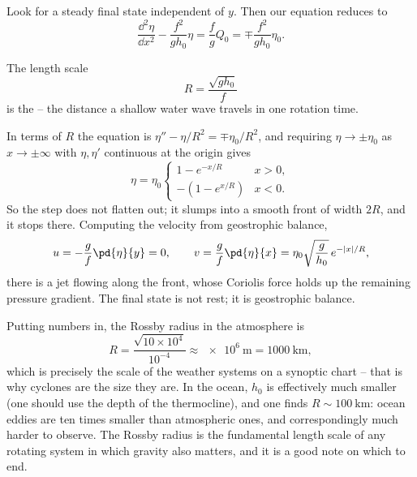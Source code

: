 \begin{example}
	Look for a steady final state independent of $y$. Then our equation reduces to
	$$
	\frac{\dd^2\eta}{\dd x^2} - \frac{f^2}{gh_0}\eta = \frac{f}{g}Q_0 = \mp\frac{f^2}{gh_0}\eta_0.
	$$

	\begin{definition}
		The length scale
		$$
		R = \frac{\sqrt{gh_0}}{f}
		$$
		is the  -- the distance a shallow water wave travels in one rotation time.
	\end{definition}

	In terms of $R$ the equation is $\eta'' - \eta/R^2 = \mp\eta_0/R^2$, and requiring $\eta \to \pm\eta_0$ as $x \to \pm\infty$ with $\eta, \eta'$ continuous at the origin gives
	$$
	\eta = \eta_0 \begin{cases} 1 - e^{-x/R} & x > 0, \\ -\left(1 - e^{x/R}\right) & x < 0.\end{cases}
	$$
	So the step does not flatten out; it slumps into a smooth front of width $2R$, and it stops there. Computing the velocity from geostrophic balance,
	$$
	u = -\frac{g}{f}\pd{\eta}{y} = 0, \qquad v = \frac{g}{f}\pd{\eta}{x} = \eta_0\sqrt{\frac{g}{h_0}}\, e^{-|x|/R},
	$$
	there is a jet flowing along the front, whose Coriolis force holds up the remaining pressure gradient. The final state is not rest; it is geostrophic balance.
\end{example}

Putting numbers in, the Rossby radius in the atmosphere is
$$
R = \frac{\sqrt{10\times 10^4}}{10^{-4}} \approx \SI{e6}{\meter} = \SI{1000}{\kilo\meter},
$$
which is precisely the scale of the weather systems on a synoptic chart -- that is why cyclones are the size they are. In the ocean, $h_0$ is effectively much smaller (one should use the depth of the thermocline), and one finds $R \sim \SI{100}{\kilo\meter}$: ocean eddies are ten times smaller than atmospheric ones, and correspondingly much harder to observe. The Rossby radius is the fundamental length scale of any rotating system in which gravity also matters, and it is a good note on which to end.

